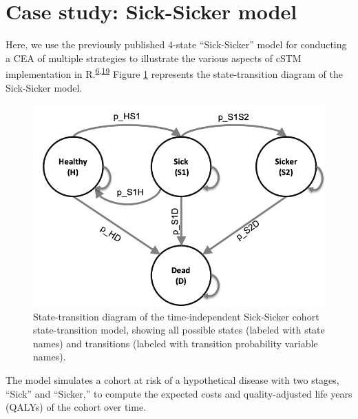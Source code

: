 \documentclass[
]{article}
\begin{document}
\hypertarget{case-study-sick-sicker-model}{%
\section{Case study: Sick-Sicker model}\label{case-study-sick-sicker-model}}

Here, we use the previously published 4-state ``Sick-Sicker'' model for conducting a CEA of multiple strategies to illustrate the various aspects of cSTM implementation in R.\textsuperscript{\protect\hyperlink{ref-Krijkamp2018}{6},\protect\hyperlink{ref-Enns2015e}{19}} Figure \ref{fig:STD-Sick-Sicker} represents the state-transition diagram of the Sick-Sicker model.

\begin{figure}[H]

{\centering \includegraphics[width=10.64in]{figs/Sick-Sicker} 

}

\caption{State-transition diagram of the time-independent Sick-Sicker cohort state-transition model, showing all possible states (labeled with state names) and transitions (labeled with transition probability variable names).}\label{fig:STD-Sick-Sicker}
\end{figure}

The model simulates a cohort at risk of a hypothetical disease with two stages, ``Sick'' and ``Sicker,'' to compute the expected costs and quality-adjusted life years (QALYs) of the cohort over time.
\end{document}
